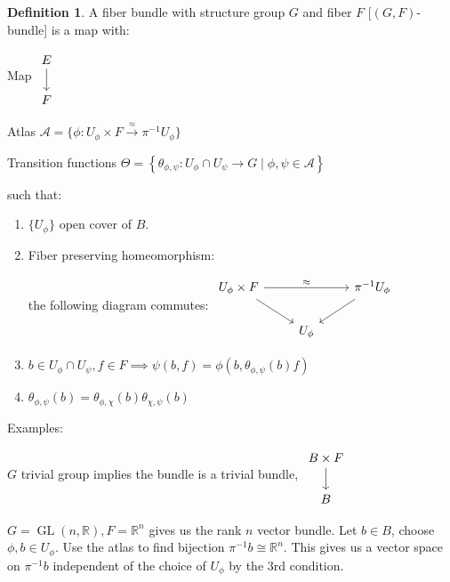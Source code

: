 \documentclass{article}
\theoremstyle{definition}
\newtheorem*{definition}{Definition}
\begin{document}
    \begin{definition}
        A fiber bundle with structure group \(G\) and fiber \(F\) [\((G,F)\)-bundle] is a map with:
        
        Map \(\begin{tikzcd}
            E \ar[d] \\ F
        \end{tikzcd}\)
        
        Atlas \(\mathcal{A} = \{ \phi : U_{\phi} \times F  \xrightarrow{\approx} \pi ^{-1} U_\phi \} \) 

        Transition functions \(\Theta = \left\{ \theta_{\phi,\psi} : U_{\phi} \cap U_{\psi} \to G \mid \phi,\psi \in \mathcal{A} \right\} \) 

        such that:

        \begin{enumerate}[label=\arabic*)]
            \item \(\{ U_{\phi} \} \) open cover of \(B\).
            \item Fiber preserving homeomorphism:
            
            the following diagram commutes: \(\begin{tikzcd}
                U_{\phi} \times F \ar[rr,"\approx"] \ar[rd] && \pi ^{-1} U_\phi\ar[ld] \\ & U_{\phi} 
            \end{tikzcd}\)   
            \item \(b \in U_{\phi}\cap U_{\psi}, f\in F \implies \psi(b,f) = \phi(b,\theta_{\phi, \psi}(b)f)\) 
            \item \(\theta_{\phi,\psi}(b) = \theta_{\phi, \chi}(b) \theta_{\chi,\psi}(b)\) 
        \end{enumerate} 
    \end{definition}

    Examples:

    \(G\) trivial group implies the bundle is a trivial bundle, \(\begin{tikzcd}
        B \times F \ar[d] \\ B
    \end{tikzcd}\) 

    \(G = \operatorname{GL}(n,\mathbb{R}), F = \mathbb{R}^n\) gives us the rank \(n\) vector bundle. Let \(b\in B\), choose \(\phi , b\in U_{\phi}\). Use the atlas to find bijection \(\pi ^{-1} b \cong \mathbb{R}^n\). This gives us a vector space on \(\pi ^{-1} b\) independent of the choice of \(U_{\phi}\) by the 3rd condition.
\end{document}
